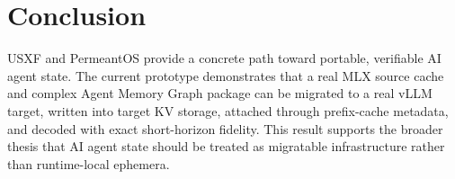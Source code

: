 \documentclass[11pt]{article}
\begin{document}
\section{Conclusion}

USXF and PermeantOS provide a concrete path toward portable, verifiable AI agent state. The current prototype demonstrates that a real MLX source cache and complex Agent Memory Graph package can be migrated to a real vLLM target, written into target KV storage, attached through prefix-cache metadata, and decoded with exact short-horizon fidelity. This result supports the broader thesis that AI agent state should be treated as migratable infrastructure rather than runtime-local ephemera.



\end{document}
